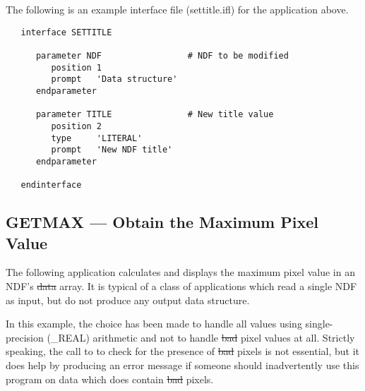 The following is an example  interface file
(settitle.ifl) for the application above. 

\small
\begin{verbatim}
   interface SETTITLE

      parameter NDF                 # NDF to be modified
         position 1
         prompt   'Data structure'
      endparameter

      parameter TITLE               # New title value
         position 2
         type     'LITERAL'
         prompt   'New NDF title'
      endparameter

   endinterface
\end{verbatim}
\normalsize

\newpage
\subsection{GETMAX --- Obtain the Maximum Pixel Value}

The following application calculates and displays the maximum pixel value in an
NDF's \st{data\/} array. It is typical of a class of applications which read a
single NDF as input, but do not produce any output data structure.

In this example, the choice has been made to handle all values using
single-precision (\_REAL) arithmetic and not to handle \st{bad\/}
pixel values at all.  Strictly speaking, the call to  to
check for the presence of \st{bad\/} pixels is not essential, but it
does help by producing an error message if someone should
inadvertently use this program on data which does contain \st{bad\/}
pixels.

